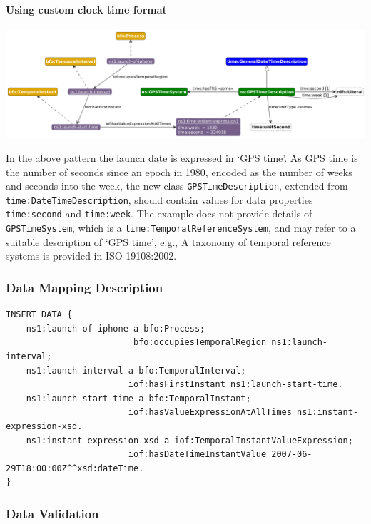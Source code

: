 \paragraph{Using custom clock time format \\}

\includegraphics[scale=0.35]{scenarios/clock-time-calendar-date/images/uc1-custom.png}

In the above pattern the launch date is expressed in `GPS time'. As GPS time is the number of seconds since an epoch in 1980, encoded as the number of weeks and seconds into the week, the new class  \texttt{GPSTimeDescription}, extended from \texttt{time:DateTimeDescription}, should contain values for data properties \texttt{time:second} and \texttt{time:week}. The example does not provide details of \texttt{GPSTimeSystem}, which is a \texttt{time:TemporalReferenceSystem}, and may refer to a suitable description of `GPS time', e.g., A taxonomy of temporal reference systems is provided in ISO 19108:2002. 


\subsubsection*{Data Mapping Description}

\begin{verbatim}
INSERT DATA {
    ns1:launch-of-iphone a bfo:Process;
                         bfo:occupiesTemporalRegion ns1:launch-interval;
    ns1:launch-interval a bfo:TemporalInterval;
                        iof:hasFirstInstant ns1:launch-start-time.
    ns1:launch-start-time a bfo:TemporalInstant;
                        iof:hasValueExpressionAtAllTimes ns1:instant-expression-xsd.
    ns1:instant-expression-xsd a iof:TemporalInstantValueExpression; 
                        iof:hasDateTimeInstantValue 2007-06-29T18:00:00Z^^xsd:dateTime.
}
\end{verbatim}


\subsubsection*{Data Validation}

